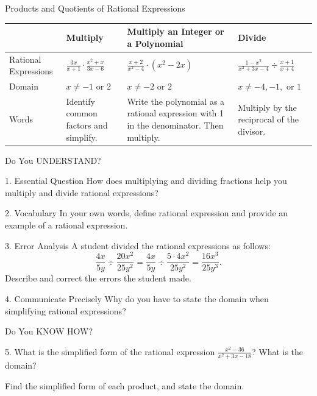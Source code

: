 \documentclass{article}
\newenvironment{concept-summary}{}{}    %
\newcommand{\answer}[1]{}               %
\begin{document}
\begin{concept-summary}
Products and Quotients of Rational Expressions

\begin{tabular}{llll}
\toprule
 & Multiply & Multiply an Integer or a Polynomial & Divide \\
\midrule
Rational Expressions &
$\frac{3x}{x+1}\cdot\frac{x^2+x}{3x-6}$ &
$\frac{x+2}{x^2-4}\cdot(x^2-2x)$ &
$\frac{1-x^2}{x^2+3x-4}\div\frac{x+1}{x+4}$ \\
Domain &
$x\neq-1$ or $2$ &
$x\neq-2$ or $2$ &
$x\neq-4,-1,$ or $1$ \\
Words &
Identify common factors and simplify. &
Write the polynomial as a rational expression with 1 in the denominator. Then multiply. &
Multiply by the reciprocal of the divisor. \\
\bottomrule
\end{tabular}

Do You UNDERSTAND?

1. Essential Question How does multiplying and dividing fractions help you multiply and divide rational expressions?
\answer{The steps and operations used to multiply and divide rational expressions are similar to those used with fractions.}

2. Vocabulary In your own words, define rational expression and provide an example of a rational expression.
\answer{A rational expression is the ratio of two polynomials that has a domain of all real numbers except those for which the denominator equals zero; Sample: $\frac{3x^2+6x}{9x}$.}

3. Error Analysis A student divided the rational expressions as follows:
\[
\frac{4x}{5y}\div\frac{20x^2}{25y^2}
=
\frac{4x}{5y}\div\frac{5\cdot4x^2}{25y^2}
=
\frac{16x^3}{25y^3}.
\]
Describe and correct the errors the student made.
\answer{The student was supposed to multiply by the reciprocal. The student also did not place any restrictions on the domain. The rational expression should be $\frac{y}{x}$, $x\neq0$, $y\neq0$.}

4. Communicate Precisely Why do you have to state the domain when simplifying rational expressions?
\answer{When the denominator equals 0, fractions are undefined.}

Do You KNOW HOW?

5. What is the simplified form of the rational expression $\frac{x^2-36}{x^2+3x-18}$? What is the domain?
\answer{$\frac{x-6}{x-3}$ for all $x$ except $-6$ and $3$.}

Find the simplified form of each product, and state the domain.


\end{concept-summary}
\end{document}
